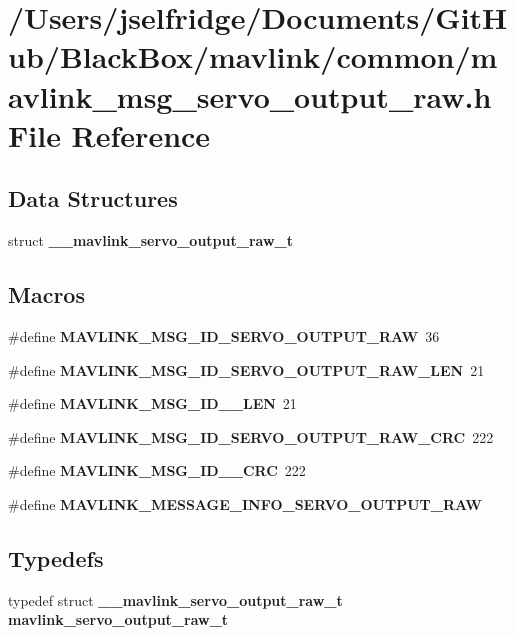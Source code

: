 \section{/\+Users/jselfridge/\+Documents/\+Git\+Hub/\+Black\+Box/mavlink/common/mavlink\+\_\+msg\+\_\+servo\+\_\+output\+\_\+raw.h File Reference}
\label{mavlink__msg__servo__output__raw_8h}
\subsection*{Data Structures}
\begin{DoxyCompactItemize}
\item 
struct \textbf{ \+\_\+\+\_\+mavlink\+\_\+servo\+\_\+output\+\_\+raw\+\_\+t}
\end{DoxyCompactItemize}
\subsection*{Macros}
\begin{DoxyCompactItemize}
\item 
\#define \textbf{ M\+A\+V\+L\+I\+N\+K\+\_\+\+M\+S\+G\+\_\+\+I\+D\+\_\+\+S\+E\+R\+V\+O\+\_\+\+O\+U\+T\+P\+U\+T\+\_\+\+R\+AW}~36
\item 
\#define \textbf{ M\+A\+V\+L\+I\+N\+K\+\_\+\+M\+S\+G\+\_\+\+I\+D\+\_\+\+S\+E\+R\+V\+O\+\_\+\+O\+U\+T\+P\+U\+T\+\_\+\+R\+A\+W\+\_\+\+L\+EN}~21
\item 
\#define \textbf{ M\+A\+V\+L\+I\+N\+K\+\_\+\+M\+S\+G\+\_\+\+I\+D\+\_\+\_\+\+L\+EN}~21
\item 
\#define \textbf{ M\+A\+V\+L\+I\+N\+K\+\_\+\+M\+S\+G\+\_\+\+I\+D\+\_\+\+S\+E\+R\+V\+O\+\_\+\+O\+U\+T\+P\+U\+T\+\_\+\+R\+A\+W\+\_\+\+C\+RC}~222
\item 
\#define \textbf{ M\+A\+V\+L\+I\+N\+K\+\_\+\+M\+S\+G\+\_\+\+I\+D\+\_\+\_\+\+C\+RC}~222
\item 
\#define \textbf{ M\+A\+V\+L\+I\+N\+K\+\_\+\+M\+E\+S\+S\+A\+G\+E\+\_\+\+I\+N\+F\+O\+\_\+\+S\+E\+R\+V\+O\+\_\+\+O\+U\+T\+P\+U\+T\+\_\+\+R\+AW}
\end{DoxyCompactItemize}
\subsection*{Typedefs}
\begin{DoxyCompactItemize}
\item 
typedef struct \textbf{ \+\_\+\+\_\+mavlink\+\_\+servo\+\_\+output\+\_\+raw\+\_\+t} \textbf{ mavlink\+\_\+servo\+\_\+output\+\_\+raw\+\_\+t}
\end{DoxyCompactItemize}


